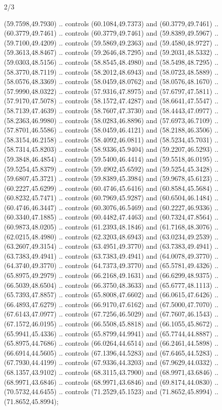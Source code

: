 \begin{flagdescription}{2/3}
\begin{scope}[xshift=0.3333\flaglength,yshift=0.5\flagwidth,scale=\flagwidth/711.3]
\begin{scope}
    (59.7598,49.7930) .. controls (60.1084,49.7373) and (60.3779,49.7461) ..
    (60.3779,49.7461) .. controls (60.3779,49.7461) and (59.8389,49.5967) ..
    (59.7100,49.4209) .. controls (59.5869,49.2363) and (59.4580,48.9727) ..
    (59.3613,48.8467) .. controls (59.2646,48.7295) and (59.2031,48.5332) ..
    (59.0303,48.5156) .. controls (58.8545,48.4980) and (58.5498,48.7295) ..
    (58.3770,48.7119) .. controls (58.2012,48.6943) and (58.0723,48.5889) ..
    (58.0576,48.3369) .. controls (58.0459,48.0762) and (58.0576,48.1670) ..
    (57.9990,48.0322) .. controls (57.9316,47.8975) and (57.6797,47.5811) ..
    (57.9170,47.5078) .. controls (58.1572,47.4287) and (58.6641,47.5547) ..
    (58.7139,47.4639) .. controls (58.7607,47.3730) and (58.4443,47.0977) ..
    (58.2363,46.9980) .. controls (58.0283,46.8896) and (57.6973,46.7109) ..
    (57.8701,46.5586) .. controls (58.0459,46.4121) and (58.2188,46.3506) ..
    (58.3154,46.2158) .. controls (58.4092,46.0811) and (58.5234,45.7031) ..
    (58.7314,45.8203) .. controls (58.9336,45.9404) and (59.2207,46.5293) ..
    (59.3848,46.4854) .. controls (59.5400,46.4414) and (59.5518,46.0195) ..
    (59.5254,45.8379) .. controls (59.4902,45.6592) and (59.5254,45.3428) ..
    (59.6807,45.3721) .. controls (59.8389,45.3984) and (59.9678,45.6123) ..
    (60.2227,45.6299) .. controls (60.4746,45.6416) and (60.8584,45.5684) ..
    (60.8232,45.7471) .. controls (60.7969,45.9287) and (60.6504,46.1484) ..
    (60.4746,46.3447) .. controls (60.3076,46.5469) and (60.2227,46.9336) ..
    (60.3340,47.1885) .. controls (60.4482,47.4463) and (60.7324,47.8564) ..
    (60.9873,48.0205) .. controls (61.2393,48.1846) and (61.7168,48.3076) ..
    (62.0215,48.4980) .. controls (62.3203,48.6943) and (63.0234,49.2539) ..
    (63.2607,49.3154) .. controls (63.4951,49.3770) and (63.7383,49.4941) ..
    (63.7383,49.4941) .. controls (63.7383,49.4941) and (64.0078,49.3770) ..
    (64.3740,49.3770) .. controls (64.7373,49.3770) and (65.5781,49.4326) ..
    (65.8975,49.2979) .. controls (66.2168,49.1631) and (66.6299,48.9375) ..
    (66.5039,48.6504) .. controls (66.3750,48.3633) and (65.6777,48.1113) ..
    (65.7393,47.8857) .. controls (65.8008,47.6602) and (66.0615,47.6426) ..
    (66.4893,47.6279) .. controls (66.9170,47.6162) and (67.5000,47.7070) ..
    (67.6143,47.0977) .. controls (67.7256,46.5029) and (67.7607,46.1543) ..
    (67.1572,46.0195) .. controls (66.5508,45.8818) and (66.1055,45.8672) ..
    (65.9941,45.4336) .. controls (65.8799,44.9941) and (65.7744,44.8887) ..
    (65.8975,44.7686) .. controls (66.0264,44.6514) and (66.2461,44.5898) ..
    (66.6914,44.5605) .. controls (67.1396,44.5283) and (67.6465,44.5283) ..
    (67.7930,44.4199) .. controls (67.9336,44.3203) and (67.9629,44.0332) ..
    (68.1357,43.9102) .. controls (68.3115,43.7900) and (68.9971,43.6846) ..
    (68.9971,43.6846) .. controls (68.9971,43.6846) and (69.8174,44.0830) ..
    (70.5732,44.6455) .. controls (71.2529,45.1523) and (71.8652,45.8994) ..
    (71.8652,45.8994);


\end{scope}
\end{scope}
\end{flagdescription}
